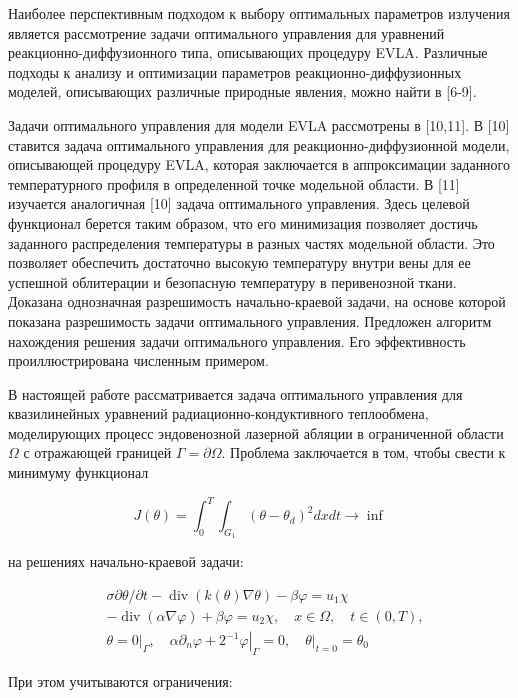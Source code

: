 \documentclass[10pt]{article}
\begin{document}
Наиболее перспективным подходом к выбору оптимальных параметров излучения является
рассмотрение задачи оптимального управления для уравнений
реакционно-диффузионного типа, описывающих процедуру EVLA.
Различные подходы к анализу и оптимизации параметров реакционно-диффузионных моделей,
описывающих различные природные явления, можно найти в [6-9].

Задачи оптимального управления для модели EVLA рассмотрены в [10,11].
В [10] ставится задача оптимального управления для реакционно-диффузионной модели,
описывающей процедуру EVLA, которая заключается в аппроксимации заданного температурного
профиля в определенной точке модельной области.
В [11] изучается аналогичная [10] задача оптимального управления.
Здесь целевой функционал берется таким образом, что его минимизация позволяет достичь
заданного распределения температуры в разных частях модельной области.
Это позволяет обеспечить достаточно высокую температуру внутри вены для ее успешной
облитерации и безопасную температуру в перивенозной ткани.
Доказана однозначная разрешимость начально-краевой задачи,
на основе которой показана разрешимость задачи оптимального управления.
Предложен алгоритм нахождения решения задачи оптимального управления.
Его эффективность проиллюстрирована численным примером.



В настоящей работе рассматривается задача оптимального управления для квазилинейных
уравнений радиационно-кондуктивного теплообмена, моделирующих процесс эндовенозной
лазерной абляции в ограниченной области $\Omega$ с отражающей границей $\Gamma=\partial\Omega$.
Проблема заключается в том, чтобы свести к минимуму функционал

\[ J(\theta)=\int_{0}^{T} \int_{G_{1}}\left(\theta-\theta_{d}\right)^{2} d x d t \rightarrow \inf \]

на решениях начально-краевой задачи:

\[
\begin{aligned}
&\sigma \partial \theta / \partial t-\operatorname{div}(k(\theta)
\nabla \theta)-\beta \varphi=u_{1} \chi \\
&-\operatorname{div}(\alpha \nabla \varphi)+\beta \varphi=u_{2}
\chi, \quad x \in \Omega, \quad t \in(0, T), \\
&\theta=\left.0\right|_{\Gamma}, \quad \alpha \partial_{n}
\varphi+\left.2^{-1} \varphi\right|_{\Gamma}=0,\left.\quad \theta\right|_{t=0}=\theta_{0}
\end{aligned}
\]

При этом учитываются ограничения:
\end{document}
